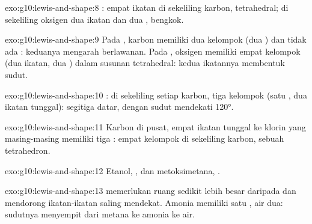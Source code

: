 \begin{solution}{exo:g10:lewis-and-shape:8}
: empat ikatan di sekeliling karbon,
tetrahedral; di sekeliling oksigen dua ikatan dan dua ,
bengkok.
\end{solution}

\begin{solution}{exo:g10:lewis-and-shape:9}
Pada , karbon memiliki dua kelompok (dua ) dan
tidak ada : keduanya mengarah berlawanan. Pada ,
oksigen memiliki empat kelompok (dua ikatan, dua ) dalam
susunan tetrahedral: kedua ikatannya membentuk sudut.
\end{solution}

\begin{solution}{exo:g10:lewis-and-shape:10}
: di sekeliling setiap karbon,
tiga kelompok (satu , dua ikatan tunggal): segitiga
datar, dengan sudut mendekati \ang{120}.
\end{solution}

\begin{solution}{exo:g10:lewis-and-shape:11}
Karbon di pusat, empat ikatan tunggal ke  klorin yang
masing-masing memiliki tiga : empat kelompok di sekeliling
karbon, sebuah tetrahedron.
\end{solution}

\begin{solution}{exo:g10:lewis-and-shape:12}
Etanol, , dan
metoksimetana,
.
\end{solution}

\begin{solution}{exo:g10:lewis-and-shape:13}
 memerlukan ruang sedikit lebih besar daripada  dan mendorong ikatan-ikatan saling mendekat. Amonia memiliki satu
, air dua: sudutnya menyempit dari metana ke amonia ke air.
\end{solution}

